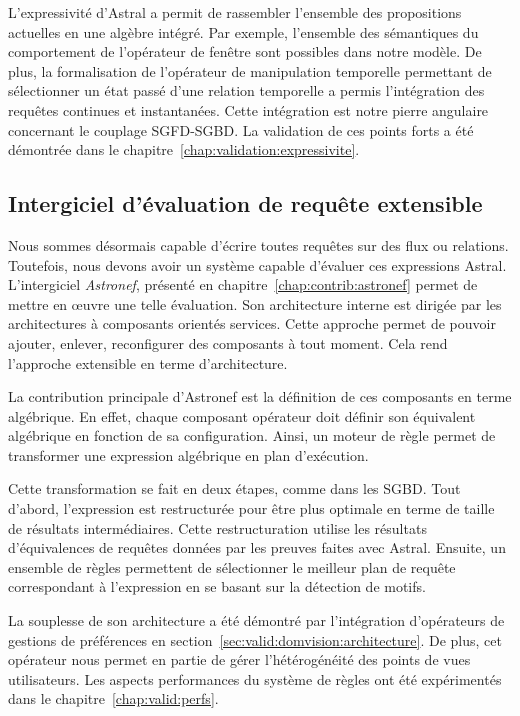 L'expressivité d'Astral a permit de rassembler l'ensemble des propositions actuelles en une algèbre intégré. Par exemple, l'ensemble des sémantiques du comportement de l'opérateur de fenêtre sont possibles dans notre modèle. De plus, la formalisation de l'opérateur de manipulation temporelle permettant de sélectionner un état passé d'une relation temporelle a permis l'intégration des requêtes continues et instantanées. Cette intégration est notre pierre angulaire concernant le couplage SGFD-SGBD. La validation de ces points forts a été démontrée dans le chapitre~\ref{chap:validation:expressivite}.

\subsection{Intergiciel d'évaluation de requête extensible}
Nous sommes désormais capable d'écrire toutes requêtes sur des flux ou relations. Toutefois, nous devons avoir un système capable d'évaluer ces expressions Astral. L'intergiciel \textit{Astronef}, présenté en chapitre~\ref{chap:contrib:astronef} permet de mettre en œuvre une telle évaluation. Son architecture interne est dirigée par les architectures à composants orientés services. Cette approche permet de pouvoir ajouter, enlever, reconfigurer des composants à tout moment. Cela rend l'approche extensible en terme d'architecture.

La contribution principale d'Astronef est la définition de ces composants en terme algébrique. En effet, chaque composant opérateur doit définir son équivalent algébrique en fonction de sa configuration. Ainsi, un moteur de règle permet de transformer une expression algébrique en plan d'exécution.

Cette transformation se fait en deux étapes, comme dans les SGBD. Tout d'abord, l'expression est restructurée pour être plus optimale en terme de taille de résultats intermédiaires. Cette restructuration utilise les résultats d'équivalences de requêtes données par les preuves faites avec Astral. Ensuite, un ensemble de règles permettent de sélectionner le meilleur plan de requête correspondant à l'expression en se basant sur la détection de motifs.

La souplesse de son architecture a été démontré par l'intégration d'opérateurs de gestions de préférences en section~\ref{sec:valid:domvision:architecture}. De plus, cet opérateur nous permet en partie de gérer l'hétérogénéité des points de vues utilisateurs. Les aspects performances du système de règles ont été expérimentés dans le chapitre~\ref{chap:valid:perfs}.

